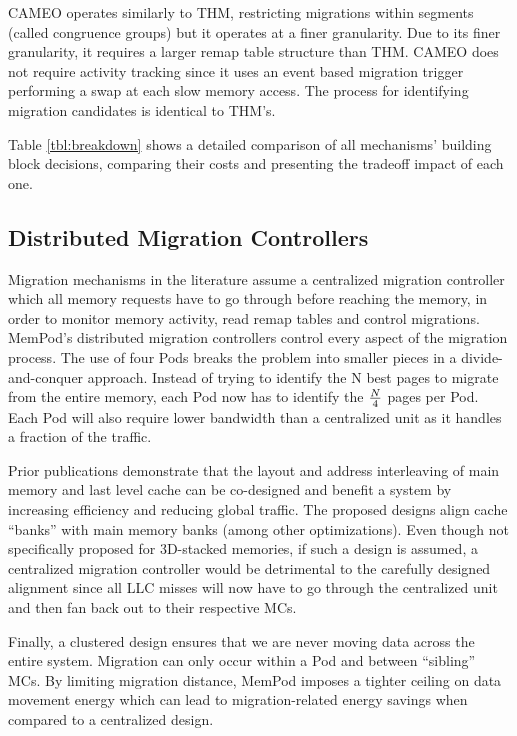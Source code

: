 CAMEO operates similarly to THM, restricting migrations within segments (called congruence groups) but it operates at a finer granularity. Due to its finer granularity, it requires a larger remap table structure than THM. CAMEO does not require activity tracking since it uses an event based migration trigger performing a swap at each slow memory access. The process for identifying migration candidates is identical to THM's.

Table \ref{tbl:breakdown} shows a detailed comparison of all mechanisms' building block decisions, comparing their costs and presenting the tradeoff impact of each one.


\subsection{Distributed Migration Controllers}


Migration mechanisms in the literature \cite{sim-micro2014,cameo} assume a centralized migration controller which all memory requests have to go through before reaching the memory, in order to monitor memory activity, read remap tables and control migrations. MemPod's distributed migration controllers control every aspect of the migration process. The use of four Pods breaks the problem into smaller pieces in a divide-and-conquer approach. Instead of trying to identify the N best pages to migrate from the entire memory, each Pod now has to identify the $N\over4$ pages per Pod. Each Pod will also require lower bandwidth than a centralized unit as it handles a fraction of the traffic.

Prior publications \cite{loh-isca08} demonstrate that the layout and address interleaving of main memory and last level cache can be co-designed and benefit a system by increasing efficiency and reducing global traffic. The proposed designs align cache ``banks'' with main memory banks (among other optimizations). Even though not specifically proposed for 3D-stacked memories, if such a design is assumed, a centralized migration controller would be detrimental to the carefully designed alignment since all LLC misses will now have to go through the centralized unit and then fan back out to their respective MCs.

Finally, a clustered design ensures that we are never moving data across the entire system. Migration can only occur within a Pod and between ``sibling'' MCs. By limiting migration distance, MemPod imposes a tighter ceiling on data movement energy which can lead to migration-related energy savings when compared to a centralized design.
